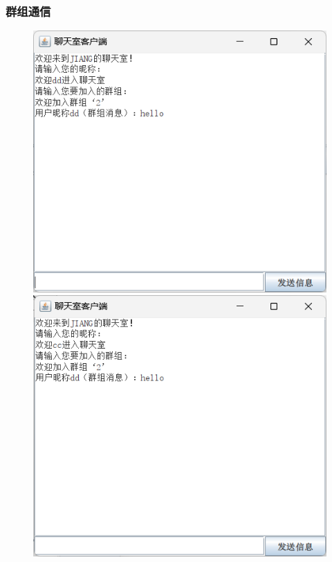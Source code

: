\documentclass[UTF8,12pt]{article}
\begin{document}
\newpage

\subsubsection{群组通信}
\begin{figure}[htbp]
    \begin{minipage}{0.49\linewidth}
		\centering
		\includegraphics[width=0.9\linewidth]{img/10.png}
	\end{minipage}
	\begin{minipage}{0.49\linewidth}
		\centering
		\includegraphics[width=0.9\linewidth]{img/11.png}
	\end{minipage}
\end{figure}
\end{document}
